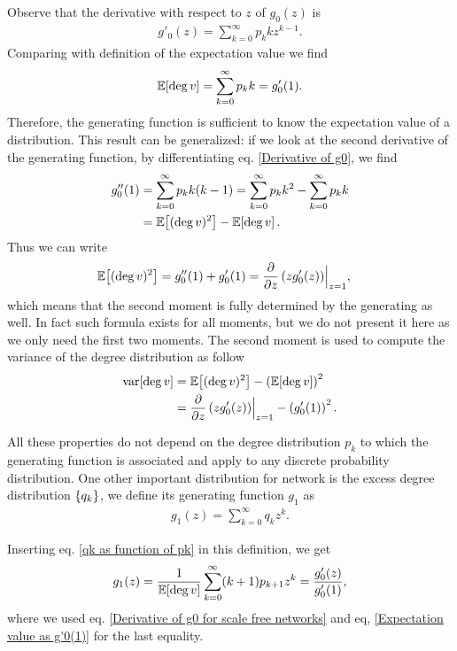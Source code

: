 \documentclass[
11pt, %
english, %
singlespacing, %
nolistspacing, %
liststotoc, %
headsepline, %
]{MastersDoctoralThesis} %
\begin{document}
Observe that the derivative with respect to $z$ of $g_0(z)$ is
\begin{align}
	g'_0(z) = \sum_{k=0}^\infty p_k k z^{k-1}. \label{Derivative of g0}
\end{align}
Comparing with definition of the expectation value we find
\begin{align}
	\mathbb{E}\!\left[ \deg{v} \right] = \sum_{k=0}^\infty p_k k = g'_0(1). \label{Expectation value as g'0(1)}
\end{align}
Therefore, the generating function is sufficient to know the expectation value of a distribution. This result can be generalized: if we look at the second derivative of the generating function, by differentiating eq. \eqref{Derivative of g0}, we find
\begin{align}
	g''_0(1) &= \sum_{k=0}^\infty p_k k (k - 1) = \sum_{k=0}^\infty p_k k^2 - \sum_{k=0}^\infty p_k k \\
		&= \mathbb{E}\!\left[ (\deg{v})^2 \right] - \mathbb{E}\!\left[ \deg{v} \right].
\end{align}
Thus we can write
\begin{align}
	\mathbb{E}\!\left[ (\deg{v})^2 \right] &= g''_0(1) + g'_0(1) = \frac{\partial}{\partial z}\left(z g'_0(z)\right)\Bigr|_{z = 1},  \label{Second moment as derivatives of g0}
\end{align}
which means that the second moment is fully determined by the generating as well. In fact such formula exists for all moments, but we do not present it here as we only need the first two moments. The second moment is used to compute the variance of the degree distribution as follow
\begin{align}
	\mathrm{var}\!\left[ \deg{v} \right] &= \mathbb{E}\!\left[ (\deg{v})^2 \right] - \left(\mathbb{E}\!\left[ \deg{v} \right]\right)^2 \\
		&= \frac{\partial}{\partial z}\left(z g'_0(z)\right)\Bigr|_{z = 1} - \left(g'_0(1)\right)^2. \label{Variance as derivatives of g0}
\end{align}

All these properties do not depend on the degree distribution $p_k$ to which the generating function is associated and apply to any discrete probability distribution. One other important distribution for network is the excess degree distribution $\{q_k\}$, we define its generating function $g_1$ as
\begin{align}
	g_1(z) = \sum_{k=0}^\infty q_k z^k. \label{Definition of g1}
\end{align}

Inserting eq. \eqref{qk as function of pk} in this definition, we get
\begin{align}
	g_1(z) = \frac{1}{\mathbb{E}\!\left[ \deg{v} \right]} \sum_{k=0}^\infty (k + 1) p_{k + 1} z^k = \frac{g'_0(z)}{g'_0(1)}, \label{g1 as a function of g0}
\end{align}
where we used eq. \eqref{Derivative of g0 for scale free networks} and eq, \eqref{Expectation value as g'0(1)} for the last equality.
\end{document}
